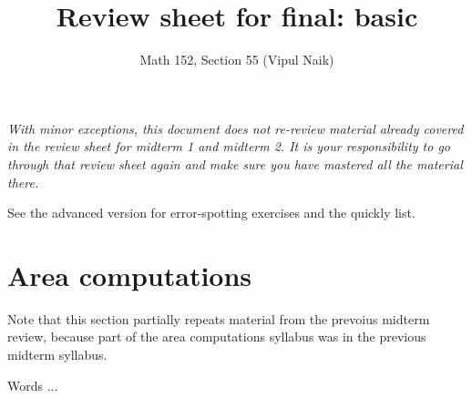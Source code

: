 \documentclass[10pt]{amsart}
\title{Review sheet for final: basic}
\author{Math 152, Section 55 (Vipul Naik)}
\begin{document}
\maketitle

{\em With minor exceptions, this document does not re-review material
already covered in the review sheet for midterm 1 and midterm 2. It is
your responsibility to go through that review sheet again and make
sure you have mastered all the material there.}

See the advanced version for error-spotting exercises and the quickly
list.
 
\section{Area computations}

Note that this section partially repeats material from the prevoius
midterm review, because part of the area computations syllabus was in
the previous midterm syllabus.

Words ...
\end{document}
